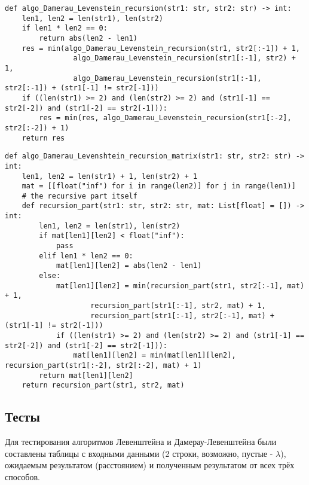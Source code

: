 \vspace{0.25cm}
\begin{lstlisting}[caption=реализация рекурсивного алгоритма Дамерау-Левенштейна, label=lst:damerau_levenshtein_recursive]
def algo_Damerau_Levenstein_recursion(str1: str, str2: str) -> int:
    len1, len2 = len(str1), len(str2)
    if len1 * len2 == 0:
        return abs(len2 - len1)
    res = min(algo_Damerau_Levenstein_recursion(str1, str2[:-1]) + 1,
                algo_Damerau_Levenstein_recursion(str1[:-1], str2) + 1,
                algo_Damerau_Levenstein_recursion(str1[:-1], str2[:-1]) + (str1[-1] != str2[-1]))
    if ((len(str1) >= 2) and (len(str2) >= 2) and (str1[-1] == str2[-2]) and (str1[-2] == str2[-1])):
        res = min(res, algo_Damerau_Levenstein_recursion(str1[:-2], str2[:-2]) + 1)
    return res
\end{lstlisting}

\vspace{0.25cm}
\begin{lstlisting}[caption=реализация рекурсивно-матричного алгоритма Дамерау-Левенштейна, label=lst:damerau_levenstein_recursive_matrix]
def algo_Damerau_Levenshtein_recursion_matrix(str1: str, str2: str) -> int:
    len1, len2 = len(str1) + 1, len(str2) + 1
    mat = [[float("inf") for i in range(len2)] for j in range(len1)]
    # the recursive part itself
    def recursion_part(str1: str, str2: str, mat: List[float] = []) -> int:
        len1, len2 = len(str1), len(str2)
        if mat[len1][len2] < float("inf"):
            pass
        elif len1 * len2 == 0:
            mat[len1][len2] = abs(len2 - len1)
        else:
            mat[len1][len2] = min(recursion_part(str1, str2[:-1], mat) + 1,
                    recursion_part(str1[:-1], str2, mat) + 1,
                    recursion_part(str1[:-1], str2[:-1], mat) + (str1[-1] != str2[-1]))
            if ((len(str1) >= 2) and (len(str2) >= 2) and (str1[-1] == str2[-2]) and (str1[-2] == str2[-1])):
                mat[len1][len2] = min(mat[len1][len2], recursion_part(str1[:-2], str2[:-2], mat) + 1)
        return mat[len1][len2]
    return recursion_part(str1, str2, mat)
\end{lstlisting}


\vspace{0.25cm}
\subsection{Тесты}

\hspace{1.25cm}
Для тестирования алгоритмов Левенштейна и Дамерау-Левенштейна были составлены таблицы с входными данными (2 строки, возможно, пустые - $\lambda$), ожидаемым результатом (расстоянием) и полученным результатом от всех трёх способов.

